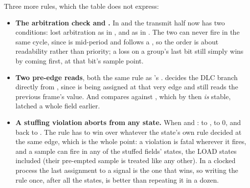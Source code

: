 Three more rules, which the table does not express:
\begin{itemize}
  \item \textbf{The arbitration check and .} In  and
     the transmit half now has two conditions: lost arbitration as in
    , and  as in . The two can never fire
    in the same cycle, since  is mid-period and  follows a
    , so the order is about readability rather than priority; a loss on a group's last
    bit still simply wins by coming first, at that bit's sample point.
  \item \textbf{Two pre-edge reads}, both the same rule as 's .
     decides the DLC branch directly from , since
     is being assigned at that very edge and still reads the previous frame's value.
    And  compares against , which by then \emph{is} stable, latched
    a whole field earlier.
  \item \textbf{A stuffing violation aborts from any state.} When  and
    :  to ,  to 0, and back to
    . The rule has to win over whatever the state's own rule decided at the same
    edge, which is the whole point: a violation is fatal wherever it fires, and a sample can fire in
    any of the stuffed fields' states, the LOAD states included (their pre-empted sample is treated
    like any other). In a clocked process the last assignment to a signal is the one that wins, so
    writing the rule once, after all the states, is better than repeating it in a dozen.
\end{itemize}

